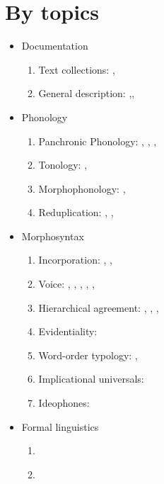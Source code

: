 \documentclass[oldfontcommands,oneside,a4paper,11pt]{article}
\begin{document}
\section{By topics}
\begin{itemize}

\item Documentation
\begin{enumerate}
\item  Text collections: \citet{jacques10gesar}, 
\item General description: \citet{jacques04these},\citet{jacques08},
\end{enumerate}


\item Phonology
\begin{enumerate}
\item  Panchronic Phonology:  \citet{jacques11lingua}, \citet{michaud-jacques12nasalite},     \citet{jacques13arapaho}, 
\item   Tonology: \citet{jacques11pumi.tone},
\item Morphophonology: \citet{jacques12khaling},   
\item Reduplication:  \citet{jacques04redupl},  \citet{jacques07redupl},
\end{enumerate}

\item Morphosyntax
\begin{enumerate}
\item  Incorporation: \citet{jacques11tangut.verb}, \citet{jacques12incorp}, 
\item  Voice:  \citet{jacques07passif}, \citet{jacques10refl}, \citet{jacques12demotion}, \citet{jacques13derivational.khaling}, \citet{jacques13tropative}, \citet{jacques14antipassive}
\item Hierarchical agreement:  \citet{jacques10inverse},     \citet{jacques12khaling},   \citet{antonov14rtau}, \citet{jacques14inverse}
\item Evidentiality: \citet{jacques14auditory}
\item Word-order typology: \citet{jacques13harmonization}, 
\item Implicational universals: \citet{antonov14need}
\item Ideophones: \citet{japhug14ideophones}
\end{enumerate}

\item Formal linguistics
\begin{enumerate}
\item \citet{walther14inv.canon}
\item \citet{walther14compactness}
\end{enumerate}


\end{itemize}
\end{document}
